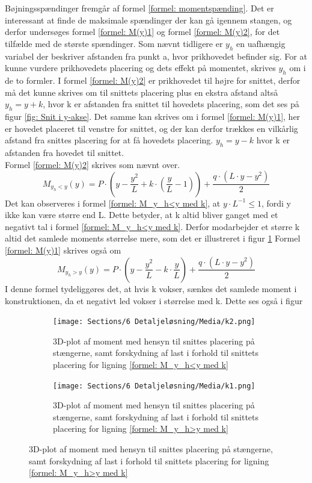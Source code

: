 Bøjningsspændinger fremgår af formel \ref{formel: momentspænding}. Det er interessant at finde de maksimale spændinger der kan gå igennem stangen, og derfor undersøges formel \ref{formel: M(y)1} og formel \ref{formel: M(y)2}, for det tilfælde med de største spændinger. Som nævnt tidligere er $y_h$ en uafhængig variabel der beskriver afstanden fra punkt a, hvor prikhovedet befinder sig. For at kunne vurdere prikhovedets placering og dets effekt på momentet, skrives $y_h$ om i de to formler. I formel \ref{formel: M(y)2} er prikhovedet til højre for snittet, derfor må det kunne skrives om til snittets placering plus en ekstra afstand altså $y_h=y+k$, hvor k er afstanden fra snittet til hovedets placering, som det ses på figur \ref{fig: Snit i y-akse}. Det samme kan skrives om i formel \ref{formel: M(y)1}, her er hovedet placeret til venstre for snittet, og der kan derfor trækkes en vilkårlig afstand fra snittes placering for at få hovedets placering. $y_h=y-k$ hvor k er afstanden fra hovedet til snittet.\\
Formel \ref{formel: M(y)2} skrives som nævnt over.
\begin{equation} \label{formel: M_y_h<y med k}
     M_{y_h<y}(y)= P\cdot (y-\frac{y^2}{L}+k\cdot (\frac{y}{L}-1))+\frac {q\cdot( L \cdot y-y^2)}{2}
\end{equation}
Det kan observeres i formel \ref{formel: M_y_h<y med k}, at $ y\cdot L^{-1} \leq 1$, fordi y ikke kan være større end L. Dette betyder, at k altid bliver ganget med et negativt tal i formel \ref{formel: M_y_h<y med k}. Derfor modarbejder et større k altid det samlede moments størrelse mere, som det er illustreret i figur \ref{fig: Afvigelse2}
Formel \ref{formel: M(y)1} skrives også om
\begin{equation} \label{formel: M_y_h>y med k}
   M_{y_h>y}(y)=P\cdot (y-\frac{y^2}{L}-k\cdot\frac{y}{L})+ \frac {q\cdot( L \cdot y-y^2)}{2}
\end{equation}
I denne formel tydeliggøres det, at hvis k vokser, sænkes det samlede moment i konstruktionen, da et negativt led vokser i størrelse med k. Dette ses også i figur 
\begin{figure}[H]
    \centering
    \begin{subfigure}[b]{0.48\textwidth}
           \texttt{[image: Sections/6 Detaljeløsning/Media/k2.png]}
            \caption{3D-plot af moment med hensyn til snittes placering på stængerne, samt forskydning af last i forhold til snittets placering for ligning \ref{formel: M_y_h<y med k}}
            \label{fig: Afvigelse2}
    \end{subfigure}
    \begin{subfigure}[b]{0.48\textwidth}
           \texttt{[image: Sections/6 Detaljeløsning/Media/k1.png]}
            \caption{3D-plot af moment med hensyn til snittes placering på stængerne, samt forskydning af last i forhold til snittets placering for ligning \ref{formel: M_y_h>y med k}}
            \label{fig: Afvigelse1}    
    \end{subfigure}
\end{figure}
        
